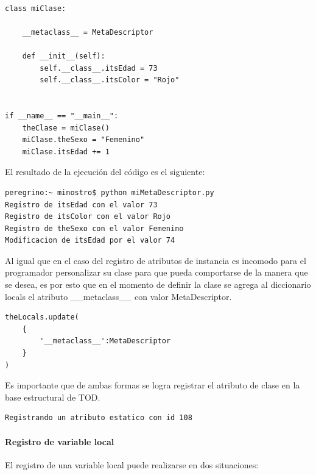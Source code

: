 \documentclass[12pt,legalpaper]{report}
\begin{document}
\begin{itemize}
\begin{singlespace}
\begin{lstlisting}[style=Python]
        
class miClase:
    
    __metaclass__ = MetaDescriptor
    
    def __init__(self):
        self.__class__.itsEdad = 73
        self.__class__.itsColor = "Rojo"
    

if __name__ == "__main__":
    theClase = miClase()
    miClase.theSexo = "Femenino"
    miClase.itsEdad += 1
\end{lstlisting}

El resultado de la ejecución del código es el siguiente:

\begin{lstlisting}[style=consola,numbers=none]
peregrino:~ minostro$ python miMetaDescriptor.py
Registro de itsEdad con el valor 73
Registro de itsColor con el valor Rojo
Registro de theSexo con el valor Femenino
Modificacion de itsEdad por el valor 74
\end{lstlisting}

\end{singlespace}

Al igual que en el caso del registro de atributos de instancia es incomodo para el programador personalizar su clase para que pueda comportarse de la manera que se desea, es por esto que en el momento de definir la clase se agrega al diccionario locals el atributo \_\_metaclass\_\_ con valor MetaDescriptor.

\begin{singlespace}
\begin{lstlisting}[style=consola,numbers=none]
theLocals.update(
    {
        '__metaclass__':MetaDescriptor
    }
)
\end{lstlisting}
\end{singlespace}
\end{itemize}
Es importante que de ambas formas se logra registrar el atributo de clase en la base estructural de TOD.

\begin{singlespace}
\begin{lstlisting}[style=consola,numbers=none]
Registrando un atributo estatico con id 108
\end{lstlisting}
\end{singlespace}


				\paragraph{Registro de variable local\label{registerLocal}}
				
El registro de una variable local puede realizarse en dos situaciones:
\end{document}
